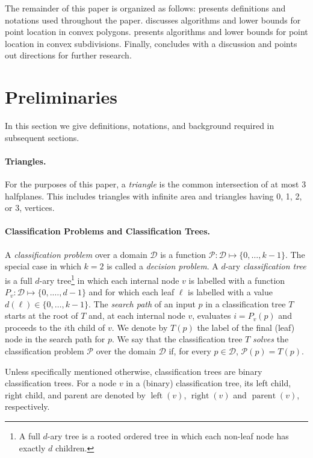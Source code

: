 \documentclass[charterfonts,lotsofwhite]{patmorin}
\DeclareMathOperator{\lft}{left}
\DeclareMathOperator{\rght}{right}
\DeclareMathOperator{\prnt}{parent}
\begin{document}
The remainder of this paper is organized as follows:  
presents definitions and notations used throughout the paper.
 discusses algorithms and lower bounds for point
location in convex polygons.   presents algorithms
and lower bounds for point location in convex subdivisions.  Finally,
 concludes with a discussion and points out
directions for further research.


\section{Preliminaries}

In this section we give definitions, notations, and background
required in subsequent sections.

\paragraph{Triangles.}  For the purposes of this paper, a
\emph{triangle} is the common intersection of at most 3 halfplanes.
This includes triangles with infinite area and triangles having 0, 1,
2, or 3, vertices.  

\paragraph{Classification Problems and Classification Trees.}

A \emph{classification problem} over a domain $\mathcal{D}$ is a
function $\mathcal{P}:\mathcal{D}\mapsto \{0,\ldots,k-1\}$.  The
special case in which $k=2$ is called a \emph{decision problem}.  A
$d$-ary \emph{classification tree} is a full $d$-ary tree\footnote{A
full $d$-ary tree is a rooted ordered tree in which each non-leaf node
has exactly $d$ children.} in which each internal node $v$ is labelled
with a function $P_v:\mathcal{D}\mapsto\{0,.\ldots,d-1\}$ and for
which each leaf $\ell$ is labelled with a value
$d(\ell)\in\{0,\ldots,k-1\}$. The \emph{search path} of an input $p$
in a classification tree $T$ starts at the root of $T$ and, at each
internal node $v$, evaluates $i=P_v(p)$ and proceeds to the $i$th
child of $v$.  We denote by $T(p)$ the label of the final (leaf) node
in the search path for $p$.  We say that the classification tree $T$
\emph{solves} the classification problem $\mathcal{P}$ over the domain
$\mathcal{D}$ if, for every $p\in \mathcal{D}$, $\mathcal{P}(p)=T(p)$.

Unless specifically mentioned otherwise, classification trees are
binary classification trees.  For a node $v$ in a (binary)
classification tree, its left child, right child, and parent are
denoted by $\lft(v)$, $\rght(v)$ and $\prnt(v)$, respectively.
\end{document}
